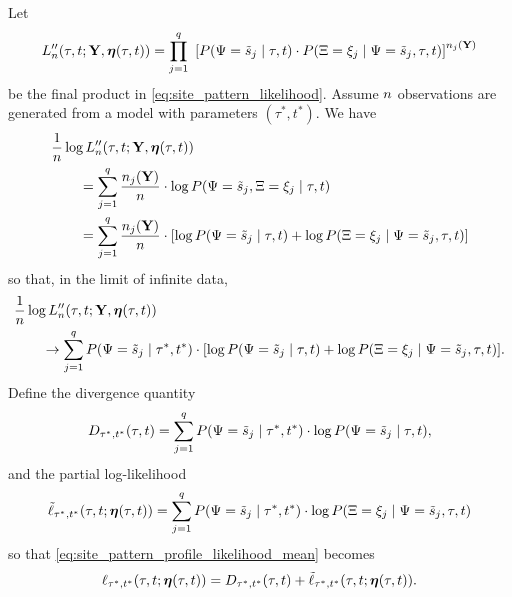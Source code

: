 Let
$$
L_\nCols''(\tau, t; \fullAlignment, \fullAncestralSplitPartitions(\tau, t)) = \prod_{j=1}^{\nSiteSplits} \ \left[P(\siteSplitRV=\siteSplit_j \mid \tau, t) \cdot P(\ancestralSplitRV=\xi_j \mid \siteSplitRV=\siteSplit_j, \tau, t)\right] ^{\nCols_j(\fullAlignment)}
$$
be the final product in \eqref{eq:site_pattern_likelihood}.
Assume $n$ observations are generated from a model with parameters $(\tau^*, t^*)$.
We have
\begin{equation*}
\begin{split}
&    \frac{1}{n} \log L_n''(\tau, t; \mathbf{Y}, \boldsymbol\eta(\tau,t)) \\
&\qquad = \sum_{j=1}^q \frac{n_j(\mathbf{Y})}{n}\cdot  \log P(\Psi=\tilde{s}_j, \Xi=\xi_j \mid \tau, t) \\
&\qquad = \sum_{j=1}^q \frac{n_j(\mathbf{Y})}{n}\cdot [\log P(\Psi=\tilde{s}_j \mid \tau, t) +
            \log P(\Xi=\xi_j \mid \Psi=\tilde{s}_j , \tau, t)]
\end{split}
\end{equation*}
so that, in the limit of infinite data,
\begin{equation}
\begin{split}
&    \frac{1}{n} \log L_n''(\tau, t; \mathbf{Y}, \boldsymbol\eta(\tau, t)) \\
&\qquad \rightarrow \sum_{j=1}^q P(\Psi=\tilde{s}_j \mid \tau^*, t^*) \cdot [\log P(\Psi=\tilde{s}_j \mid \tau, t) + \log P(\Xi=\xi_j \mid \Psi=\tilde{s}_j , \tau, t)]. \label{eq:site_pattern_profile_likelihood_mean}
\end{split}
\end{equation}
Define the divergence quantity
$$
D_{\tau^*,t^*}(\tau,t) = \sum_{j=1}^q P(\Psi=\tilde{s}_j \mid \tau^*, t^*)\cdot\log P(\Psi=\tilde{s}_j \mid \tau, t),
$$
and the partial log-likelihood
$$
\tilde{\ell}_{\tau^*,t^*}(\tau, t; \boldsymbol\eta(\tau,t)) = \sum_{j=1}^q P(\Psi=\tilde{s}_j \mid \tau^*, t^*)\cdot\log P(\Xi=\xi_j \mid \Psi = \tilde{s}_j, \tau, t)
$$
so that \eqref{eq:site_pattern_profile_likelihood_mean} becomes
\begin{equation}
    \label{eq:log_likelihood_simplified}
    \ell_{\tau^*,t^*}(\tau, t; \boldsymbol\eta(\tau,t)) = D_{\tau^*,t^*}(\tau,t) + \tilde{\ell}_{\tau^*,t^*}(\tau, t; \boldsymbol\eta(\tau,t)).
\end{equation}

